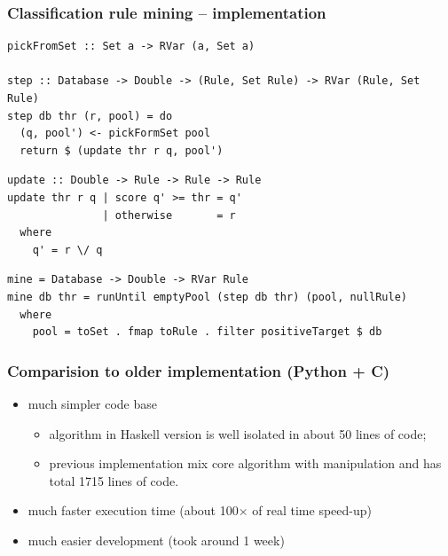 \documentclass[mathserif, 8pt, handout]{beamer}
\def\fs{\vskip0ex}
\begin{document}
\begin{frame}[fragile]
  \frametitle{Classification rule mining -- implementation}


\begin{verbatim}
pickFromSet :: Set a -> RVar (a, Set a)

step :: Database -> Double -> (Rule, Set Rule) -> RVar (Rule, Set Rule)
step db thr (r, pool) = do
  (q, pool') <- pickFormSet pool
  return $ (update thr r q, pool')
\end{verbatim}
  \pause
\begin{verbatim}
update :: Double -> Rule -> Rule -> Rule
update thr r q | score q' >= thr = q'
               | otherwise       = r
  where
    q' = r \/ q
\end{verbatim}
  \pause
\begin{verbatim}
mine = Database -> Double -> RVar Rule
mine db thr = runUntil emptyPool (step db thr) (pool, nullRule)
  where
    pool = toSet . fmap toRule . filter positiveTarget $ db
\end{verbatim}
\end{frame}

\begin{frame}
  \frametitle{Comparision to older implementation (Python + C)}
  \begin{itemize}
  \item much simpler code base
    \begin{itemize}
    \item algorithm in Haskell version is well isolated in about 50 lines of code;
    \item previous implementation mix core algorithm with manipulation and has
      total 1715 lines of code.
    \end{itemize}
  \item much faster execution time (about 100$\times$ of real time speed-up)
  \item much easier development (took around 1 week)
  \end{itemize}
\end{frame}
\end{document}
